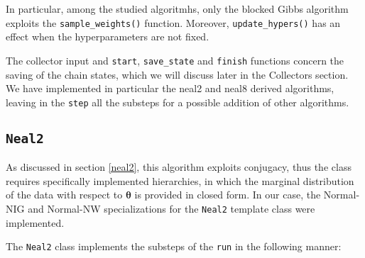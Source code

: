 In particular, among the studied algoritmhs, only the blocked Gibbs algorithm exploits the \verb|sample_weights()| function. Moreover, \verb|update_hypers()| has an effect  when the hyperparameters are not fixed.

The collector input and \verb|start|, \verb|save_state| and \verb|finish| functions concern the saving of the chain states, which we will discuss later in the Collectors section.
We have implemented in particular the neal2 and neal8 derived algorithms, leaving in the \verb|step| all the substeps for a possible addition of other algorithms.




\subsection{\texttt{Neal2}}

As discussed in section \ref{neal2}, this algorithm exploits conjugacy, thus the class requires specifically implemented hierarchies, in which the marginal distribution of the data with respect to $\boldsymbol\theta$ is provided in closed form.
In our case, the Normal-NIG and Normal-NW specializations for the \verb|Neal2| template class were implemented.

The \verb|Neal2| class implements the substeps of the \verb|run| in the following manner:

